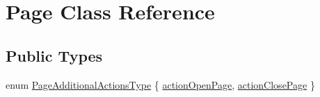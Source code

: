 \hypertarget{class_page}{}\section{Page Class Reference}
\label{class_page}
\subsection*{Public Types}
\begin{DoxyCompactItemize}
\item 
enum \hyperlink{class_page_a283db2a63b02abe61631781a057c4746}{Page\+Additional\+Actions\+Type} \{ \hyperlink{class_page_a283db2a63b02abe61631781a057c4746a5f1f2435b57253632eec56462f73e2aa}{action\+Open\+Page}, 
\hyperlink{class_page_a283db2a63b02abe61631781a057c4746a49adb8e6acf66f345912cfdc78f11667}{action\+Close\+Page}
 \}
\end{DoxyCompactItemize}
